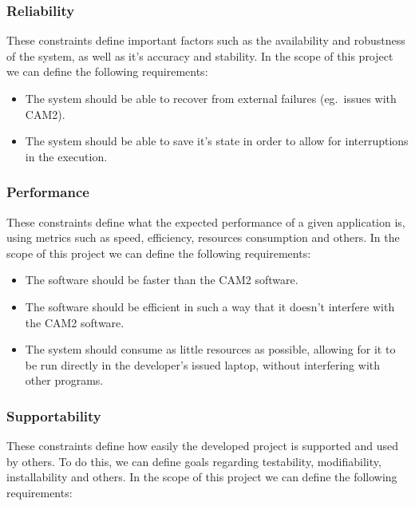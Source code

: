 \subsubsection{Reliability}

These constraints define important factors such as the availability and robustness of the system, as well as it's accuracy and stability. In the scope of this project we can define the following requirements:

\begin{itemize}
	\item The system should be able to recover from external failures (eg.\ issues with CAM2\textsuperscript{\textregistered}).
	\item The system should be able to save it's state in order to allow for interruptions in the execution.
\end{itemize}

\subsubsection{Performance}

These constraints define what the expected performance of a given application is, using metrics such as speed, efficiency, resources consumption and others. In the scope of this project we can define the following requirements:

\begin{itemize}
	\item The software should be faster than the CAM2\textsuperscript{\textregistered} software.
	\item The software should be efficient in such a way that it doesn't interfere with the CAM2\textsuperscript{\textregistered} software.
	\item The system should consume as little resources as possible, allowing for it to be run directly in the developer's issued laptop, without interfering with other programs.
\end{itemize}

\subsubsection{Supportability}

These constraints define how easily the developed project is supported and used by others. To do this, we can define goals regarding testability, modifiability, installability and others. In the scope of this project we can define the following requirements:

